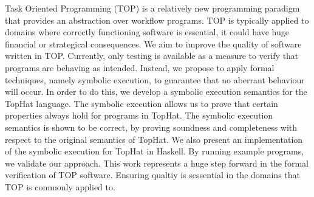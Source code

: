 
Task Oriented Programming (TOP) is a relatively new programming paradigm that provides an abstraction over workflow programs.
TOP is typically applied to domains where correctly functioning software is essential, it could have huge financial or strategical consequences.
We aim to improve the quality of software written in TOP.
Currently, only testing is available as a measure to verify that programs are behaving as intended.
Instead, we propose to apply formal techniques, namely symbolic execution, to guarantee that no aberrant behaviour will occur.
In order to do this, we develop a symbolic execution semantics for the TopHat language.
The symbolic execution allows us to prove that certain properties always hold for programs in TopHat.
The symbolic execution semantics is shown to be correct, by proving soundness and completeness with respect to the original semantics of TopHat.
We also present an implementation of the symbolic execution for TopHat in Haskell.
By running example programs, we validate our approach.
This work represents a huge step forward in the formal verification of TOP software.
Ensuring qualtiy is sessential in the domains that TOP is commonly applied to.


